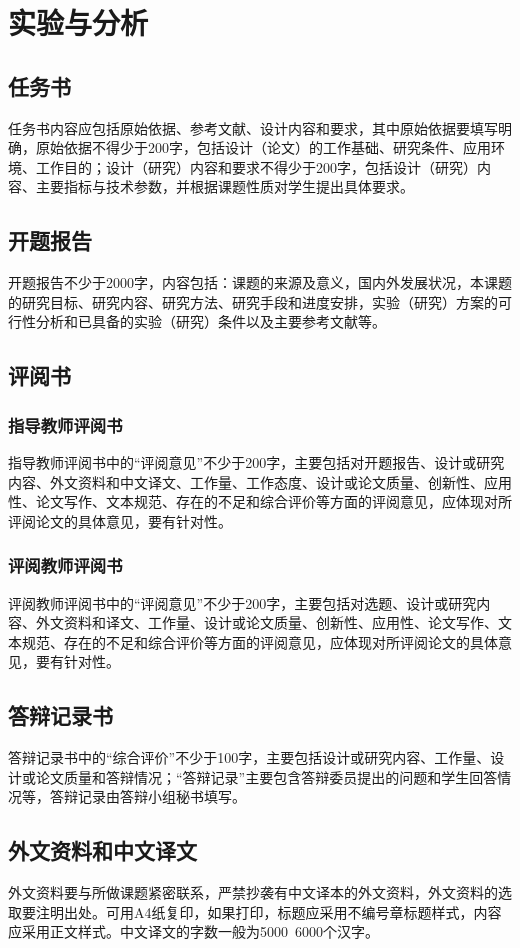 \chapter{实验与分析}

\section{任务书}

任务书内容应包括原始依据、参考文献、设计内容和要求，其中原始依据要填写明确，原始依据不得少于200字，包括设计（论文）的工作基础、研究条件、应用环境、工作目的；设计（研究）内容和要求不得少于200字，包括设计（研究）内容、主要指标与技术参数，并根据课题性质对学生提出具体要求。

\section{开题报告}

开题报告不少于2000字，内容包括：课题的来源及意义，国内外发展状况，本课题的研究目标、研究内容、研究方法、研究手段和进度安排，实验（研究）方案的可行性分析和已具备的实验（研究）条件以及主要参考文献等。

\section{评阅书}

\subsection{指导教师评阅书}

指导教师评阅书中的“评阅意见”不少于200字，主要包括对开题报告、设计或研究内容、外文资料和中文译文、工作量、工作态度、设计或论文质量、创新性、应用性、论文写作、文本规范、存在的不足和综合评价等方面的评阅意见，应体现对所评阅论文的具体意见，要有针对性。

\subsection{评阅教师评阅书}

评阅教师评阅书中的“评阅意见”不少于200字，主要包括对选题、设计或研究内容、外文资料和译文、工作量、设计或论文质量、创新性、应用性、论文写作、文本规范、存在的不足和综合评价等方面的评阅意见，应体现对所评阅论文的具体意见，要有针对性。

\section{答辩记录书}

答辩记录书中的“综合评价”不少于100字，主要包括设计或研究内容、工作量、设计或论文质量和答辩情况；“答辩记录”主要包含答辩委员提出的问题和学生回答情况等，答辩记录由答辩小组秘书填写。

\section{外文资料和中文译文}

外文资料要与所做课题紧密联系，严禁抄袭有中文译本的外文资料，外文资料的选取要注明出处。可用A4纸复印，如果打印，标题应采用不编号章标题样式，内容应采用正文样式。中文译文的字数一般为5000~6000个汉字。

\clearpage